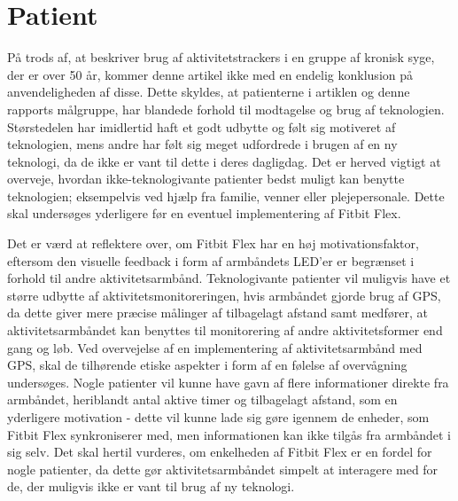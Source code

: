 \section{Patient} \label{sec:dis_patient}
På trods af, at \citeauthor{mercer2016} beskriver brug af aktivitetstrackers i en gruppe af kronisk syge, der er over 50 år, kommer denne artikel ikke med en endelig konklusion på anvendeligheden af disse. Dette skyldes, at patienterne i artiklen og denne rapports målgruppe, har blandede forhold til modtagelse og brug af teknologien. Størstedelen har imidlertid haft et godt udbytte og følt sig motiveret af teknologien, mens andre har følt sig meget udfordrede i brugen af en ny teknologi, da de ikke er vant til dette i deres dagligdag. Det er herved vigtigt at overveje, hvordan ikke-teknologivante patienter bedst muligt kan benytte teknologien; eksempelvis ved hjælp fra familie, venner eller plejepersonale. Dette skal undersøges yderligere før en eventuel implementering af Fitbit Flex. 

Det er værd at reflektere over, om Fitbit Flex har en høj motivationsfaktor, eftersom den visuelle feedback i form af armbåndets LED'er er begrænset i forhold til andre aktivitetsarmbånd. 
Teknologivante patienter vil muligvis have et større udbytte af aktivitetsmonitoreringen, hvis armbåndet gjorde brug af GPS, da dette giver mere præcise målinger af tilbagelagt afstand samt medfører, at aktivitetsarmbåndet kan benyttes til monitorering af andre aktivitetsformer end gang og løb. Ved overvejelse af en implementering af aktivitetsarmbånd med GPS, skal de tilhørende etiske aspekter i form af en følelse af overvågning undersøges.
Nogle patienter vil kunne have gavn af flere informationer direkte fra armbåndet, heriblandt antal aktive timer og tilbagelagt afstand, som en yderligere motivation - dette vil kunne lade sig gøre igennem de enheder, som Fitbit Flex synkroniserer med, men informationen kan ikke tilgås fra armbåndet i sig selv. Det skal hertil vurderes, om enkelheden af Fitbit Flex er en fordel for nogle patienter, da dette gør aktivitetsarmbåndet simpelt at interagere med for de, der muligvis ikke er vant til brug af ny teknologi. 

